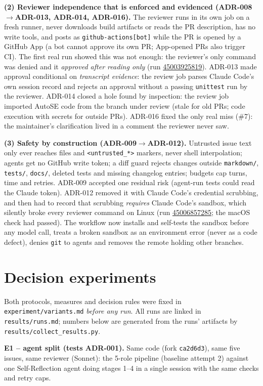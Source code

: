 \documentclass[10pt,a4paper]{article}
\newcommand{\run}[1]{\href{https://github.com/MittalManas2005/markdown/actions/runs/#1}{#1}}
\newcommand{\adr}[1]{ADR-#1}
\begin{document}
\textbf{(2) Reviewer independence that is enforced and evidenced (\adr{008}$\rightarrow$\adr{013}, \adr{014}, \adr{016}).}
The reviewer runs in its own job on a fresh runner, never downloads build artifacts or reads the PR description, has no
write tools, and posts as \texttt{github-actions[bot]} while the PR is opened by a GitHub App (a bot cannot approve its own
PR; App-opened PRs also trigger CI). The first real run showed this was not enough: the reviewer's only command was
denied and it \emph{approved after reading only} (run \run{45003925819}). \adr{013} made approval conditional on
\emph{transcript evidence}: the review job parses Claude Code's own session record and rejects an approval without a
passing \texttt{unittest} run by the reviewer. \adr{014} closed a hole found by inspection: the review job imported AutoSE
code from the branch under review (stale for old PRs; code execution with secrets for outside PRs). \adr{016} fixed the
only real miss (\#7): the maintainer's clarification lived in a comment the reviewer never saw.

\textbf{(3) Safety by construction (\adr{009}$\rightarrow$\adr{012}).} Untrusted issue text only ever reaches files and
\texttt{<untrusted\_*>} markers, never shell interpolation; agents get no GitHub write token; a diff guard rejects changes
outside \texttt{markdown/}, \texttt{tests/}, \texttt{docs/}, deleted tests and missing changelog entries; budgets cap turns,
time and retries. \adr{009} accepted one residual risk (agent-run tests could read the Claude token). \adr{012} removed it
with Claude Code's credential scrubbing, and then had to record that scrubbing \emph{requires} Claude Code's sandbox, which
silently broke every reviewer command on Linux (run \run{45006857285}; the macOS check had passed). The workflow now
installs and self-tests the sandbox before any model call, treats a broken sandbox as an environment error (never as a
code defect), denies \texttt{git} to agents and removes the remote holding other branches.

\section{Decision experiments}\label{sec:exp}
Both protocols, measures and decision rules were fixed in \texttt{experiment/variants.md} \emph{before any run}. All runs
are linked in \texttt{results/runs.md}; numbers below are generated from the runs' artifacts by
\texttt{results/collect\_results.py}.

\textbf{E1 -- agent split (tests \adr{001}).} Same code (fork \texttt{ca2d6d3}), same five issues, same reviewer (Sonnet):
the 5-role pipeline (baseline attempt 2) against one Self-Reflection agent doing stages 1--4 in a single session with the
same checks and retry caps.
\end{document}
